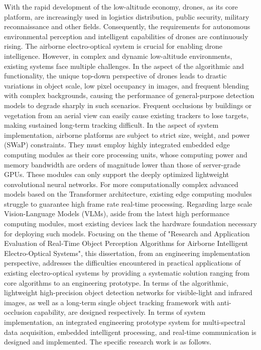 
\begin{englishabstract}
With the rapid development of the low-altitude economy, drones, as its core platform, are increasingly used in logistics distribution, public security, military reconnaissance and other fields. Consequently, the requirements for autonomous environmental perception and intelligent capabilities of drones are continuously rising. The airborne electro-optical system is crucial for enabling drone intelligence. However, in complex and dynamic low-altitude environments, existing systems face multiple challenges. In the aspect of the algorithmic and functionality, the unique top-down perspective of drones leads to drastic variations in object scale, low pixel occupancy in images, and frequent blending with complex backgrounds, causing the performance of general-purpose detection models to degrade sharply in such scenarios. Frequent occlusions by buildings or vegetation from an aerial view can easily cause existing trackers to lose targets, making sustained long-term tracking difficult. In the aspect of system implementation, airborne platforms are subject to strict size, weight, and power (SWaP) constraints. They must employ highly integrated embedded edge computing modules as their core processing units, whose computing power and memory bandwidth are orders of magnitude lower than those of server-grade GPUs. These modules can only support the deeply optimized lightweight convolutional neural networks. For more computationally complex advanced models based on the Transformer architecture, existing edge computing modules struggle to guarantee high frame rate real-time processing. Regarding large scale Vision-Language Models (VLMs), aside from the latest high performance computing modules, most existing devices lack the hardware foundation necessary for deploying such models. Focusing on the theme of "Research and Application Evaluation of Real-Time Object Perception Algorithms for Airborne Intelligent Electro-Optical Systems", this dissertation, from an engineering implementation perspective, addresses the difficulties encountered in practical applications of existing electro-optical systems by providing a systematic solution ranging from core algorithms to an engineering prototype. In terms of the algorithmic, lightweight high-precision object detection networks for visible-light and infrared images, as well as a long-term single object tracking framework with anti-occlusion capability, are designed respectively. In terms of system implementation, an integrated engineering prototype system for multi-spectral data acquisition, embedded intelligent processing, and real-time communication is designed and implemented. The specific research work is as follows.



\end{englishabstract}
